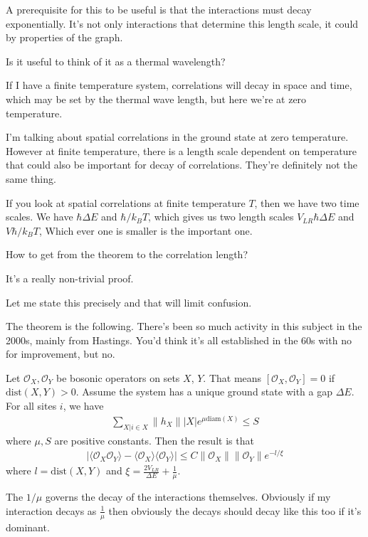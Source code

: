 A prerequisite for this to be useful is that the interactions must decay
exponentially.
It's not only interactions that determine this length scale,
it could by properties of the graph.

\begin{question}
    Is it useful to think of it as a thermal wavelength?
\end{question}
If I have a finite temperature system, correlations will decay in space and
time, which may be set by the thermal wave length,
but here we're at zero temperature.

I'm talking about spatial correlations in the ground state at zero temperature.
However at finite temperature, there is a length scale dependent on temperature
that could also be important for decay of correlations.
They're definitely not the same thing.

If you look at spatial correlations at finite temperature $T$,
then we have two time scales.
We have $\hbar\Delta E$ and $\hbar/k_B T$,
which gives us two length scales
$V_{LR}\hbar\Delta E$ and $V\hbar/k_B T$,
Which ever one is smaller is the important one.


\begin{question}
    How to get from the theorem to the correlation length?
\end{question}
It's a really non-trivial proof.

Let me state this precisely and that will limit confusion.

The theorem is the following.
There's been so much activity in this subject in the 2000s,
mainly from Hastings.
You'd think it's all established in the 60s with no for improvement,
but no.
\begin{theorem}
    Let $\mathcal{O}_X,\mathcal{O}_Y$ be bosonic operators
    on sets $X$, $Y$.
    That means $[\mathcal{O}_X,\mathcal{O}_Y]=0$ if $\mathrm{dist}(X, Y) > 0$.
    Assume the system has a unique ground state with a gap $\Delta E$.
    For all sites $i$, we have
    \begin{align}
        \sum_{X| i\in X} \| h_X \| |X| e^{\mu\mathrm{diam}(X)} \le S
    \end{align}
    where $\mu,S$ are positive constants.
    Then the result is that
    \begin{align}
        | \langle \mathcal{O}_X \mathcal{O}_Y\rangle
        - \langle \mathcal{O}_X \rangle\langle \mathcal{O}_Y\rangle
        | \le
        C\| \mathcal{O}_X \| \|\mathcal{O}_Y\| e^{-l/\xi}
    \end{align}
    where $l=\mathrm{dist}(X, Y)$ and
    $\xi=\frac{2V_{LR}}{\Delta E} + \frac{1}{\mu}$.
\end{theorem}
The $1/\mu$ governs the decay of the interactions themselves.
Obviously if my interaction decays as $\frac{1}{\mu}$
then obviously the decays should decay like this too if it's dominant.


